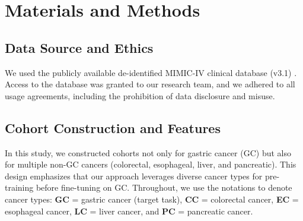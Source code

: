 \documentclass[diagnostics,article,submit,pdftex,moreauthors]{Definitions/mdpi}
\begin{document}



\section{Materials and Methods}

\subsection{Data Source and Ethics}
We used the publicly available de-identified MIMIC-IV clinical database (v3.1) \citep{Johnson2024MIMICIV}.
Access to the database was granted to our research team, and we adhered to all usage agreements, including the prohibition of data disclosure and misuse.

\subsection{Cohort Construction and Features}
In this study, we constructed cohorts not only for gastric cancer (GC) but also for multiple non-GC cancers (colorectal, esophageal, liver, and pancreatic).
This design emphasizes that our approach leverages diverse cancer types for pre-training before fine-tuning on GC.
Throughout, we use the notations to denote cancer types: \textbf{GC} = gastric cancer (target task), \textbf{CC} = colorectal cancer, \textbf{EC} = esophageal cancer, \textbf{LC} = liver cancer, and \textbf{PC} = pancreatic cancer.
\end{document}
